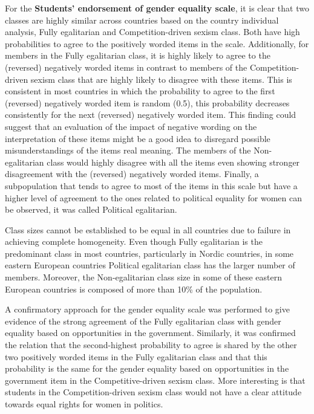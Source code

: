 \documentclass[12pt,a4paper,oneside]{reedthesis}
\begin{document}
For the \textbf{Students' endorsement of gender equality scale}, it is clear that two classes are highly similar across countries based on the country individual analysis, Fully egalitarian and Competition-driven sexism class. Both have high probabilities to agree to the positively worded items in the scale. Additionally, for members in the Fully egalitarian class, it is highly likely to agree to the (reversed) negatively worded items in contrast to members of the Competition-driven sexism class that are highly likely to disagree with these items. This is consistent in most countries in which the probability to agree to the first (reversed) negatively worded item is random (0.5), this probability decreases consistently for the next (reversed) negatively worded item. This finding could suggest that an evaluation of the impact of negative wording on the interpretation of these items might be a good idea to disregard possible misunderstandings of the items real meaning. The members of the Non-egalitarian class would highly disagree with all the items even showing stronger disagreement with the (reversed) negatively worded items. Finally, a subpopulation that tends to agree to most of the items in this scale but have a higher level of agreement to the ones related to political equality for women can be observed, it was called Political egalitarian.

Class sizes cannot be established to be equal in all countries due to failure in achieving complete homogeneity. Even though Fully egalitarian is the predominant class in most countries, particularly in Nordic countries, in some eastern European countries Political egalitarian class has the larger number of members. Moreover, the Non-egalitarian class size in some of these eastern European countries is composed of more than 10\% of the population.

A confirmatory approach for the gender equality scale was performed to give evidence of the strong agreement of the Fully egalitarian class with gender equality based on opportunities in the government. Similarly, it was confirmed the relation that the second-highest probability to agree is shared by the other two positively worded items in the Fully egalitarian class and that this probability is the same for the gender equality based on opportunities in the government item in the Competitive-driven sexism class. More interesting is that students in the Competition-driven sexism class would not have a clear attitude towards equal rights for women in politics.
\end{document}
